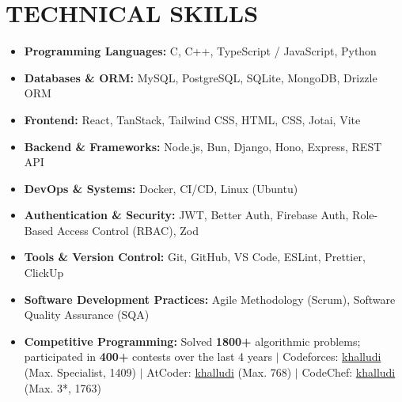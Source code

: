 \documentclass[10pt]{article} %
\newenvironment{rSection}[1]{
  \section*{#1}
}{
  \vspace{-5pt}
}
\begin{document}
\begin{rSection}{TECHNICAL SKILLS}
\vspace{10pt}

\begin{itemize}[label=$\bullet$, itemsep=0pt, parsep=0pt, leftmargin=15pt]
    \item \textbf{Programming Languages:} C, C++, TypeScript / JavaScript, Python
    \item \textbf{Databases \& ORM:} MySQL, PostgreSQL, SQLite, MongoDB, Drizzle ORM
    \item \textbf{Frontend:} React, TanStack, Tailwind CSS, HTML, CSS, Jotai, Vite
    \item \textbf{Backend \& Frameworks:} Node.js, Bun, Django, Hono, Express, REST API
    \item \textbf{DevOps \& Systems:} Docker, CI/CD, Linux (Ubuntu)
    \item \textbf{Authentication \& Security:} JWT, Better Auth, Firebase Auth, Role-Based Access Control (RBAC), Zod
    \item \textbf{Tools \& Version Control:} Git, GitHub, VS Code, ESLint, Prettier, ClickUp
    \item \textbf{Software Development Practices:} Agile Methodology (Scrum), Software Quality Assurance (SQA)
    \item \textbf{Competitive Programming:} Solved \textbf{1800+} algorithmic problems; participated in \textbf{400+} contests over the last 4 years $|$ Codeforces: \href{https://codeforces.com/profile/khalludi}{khalludi} (Max. Specialist, 1409) $|$ AtCoder: \href{https://atcoder.jp/users/khalludi}{khalludi} (Max. 768) $|$ CodeChef: \href{https://www.codechef.com/users/khalludi}{khalludi} (Max. 3*, 1763)
\end{itemize}

\end{rSection}

\vspace{6pt}

\end{document}
